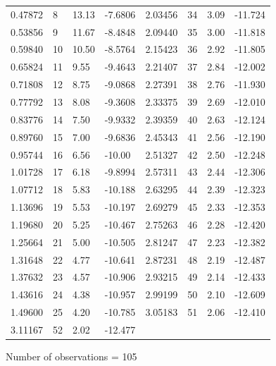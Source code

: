 \documentclass[11pt]{article}
\begin{document}
\begin{appendices}
\begin{table}[H]
\begin{small}
\begin{center}
\begin{tabular}{|p{15mm} p{15mm} p{15mm} p{15mm} || p{15mm} p{15mm}p{15mm} p{15mm}|}
		 0.47872     &  8     &      13.13   &      -7.6806 & 2.03456    &  34    &        3.09         &-11.724\\ 
		 0.53856     &  9     &      11.67   &      -8.4848  & 2.09440    &  35    &        3.00    &     -11.818\\ 
		 0.59840     & 10    &       10.50  &       -8.5764 &    2.15423    &  36    &        2.92    &     -11.805\\ 
		 0.65824     & 11    &        9.55   &      -9.4643 &  2.21407    &  37    &        2.84    &     -12.002\\ 
		 0.71808     & 12    &        8.75   &      -9.0868 &  2.27391    &  38    &        2.76    &     -11.930\\ 
		 0.77792     & 13    &        8.08   &      -9.3608 &  2.33375    &  39    &        2.69    &     -12.010\\ 
		 0.83776     & 14    &        7.50     &    -9.9332 &  2.39359    &  40    &        2.63    &     -12.124\\ 
		 0.89760     & 15    &        7.00     &    -9.6836 &  2.45343    &  41    &        2.56    &     -12.190\\ 
		 0.95744     & 16    &        6.56     &    -10.00  & 2.51327    &  42           & 2.50    &     -12.248\\ 
		 1.01728     & 17    &        6.18     &    -9.8994 & 2.57311    &  43      &      2.44    &     -12.306\\ 
		 1.07712     & 18    &        5.83     &    -10.188 & 2.63295    &  44      &      2.39    &     -12.323\\ 
		 1.13696     & 19    &        5.53     &    -10.197 & 2.69279    &  45      &      2.33    &     -12.353\\ 
		 1.19680     & 20    &        5.25     &    -10.467 &  2.75263    &  46      &      2.28    &     -12.420\\ 
		 1.25664     & 21    &        5.00     &    -10.505 &  2.81247    &  47      &      2.23    &     -12.382\\ 
		 1.31648     & 22    &        4.77    &    -10.641 &  2.87231    &  48      &      2.19    &     -12.487\\ 
		 1.37632     & 23    &        4.57     &    -10.906 &  2.93215    &  49      &    2.14      &   -12.433\\ 
		 1.43616     & 24    &        4.38     &    -10.957 &  2.99199    &  50        &    2.10    &     -12.609\\ 
		 1.49600      &25    &        4.20     &    -10.785 &   3.05183    &  51      &      2.06    &     -12.410\\ 
		 3.11167    &  52      &      2.02    &     -12.477 & & & & \\   \hline \hline
	\end{tabular}
	\end{center}
	\end{small}
	Number of observations = 105
\end{table}


\end{appendices}
\end{document}
